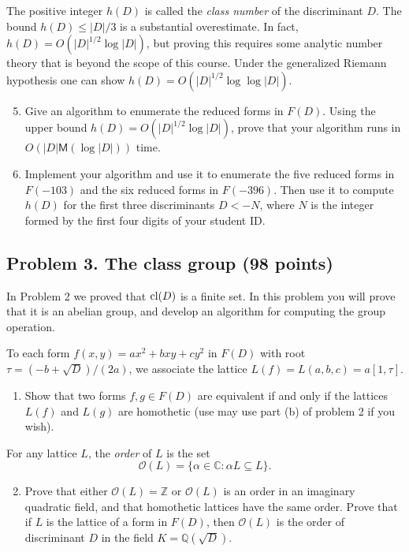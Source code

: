 \documentclass[11pt]{article}
\newcommand{\Q}{\mathbb{Q}}
\newcommand{\C}{\mathbb{C}}
\newcommand{\Z}{\mathbb{Z}}
\newcommand{\M}{\textsf{M}}
\renewcommand{\O}{\mathcal{O}}
\newcommand{\cl}{{\rm cl}}
\theoremstyle{definition}
\begin{document}
The positive integer $h(D)$ is called the \emph{class number} of the discriminant $D$.
The bound $h(D)\le|D|/3$ is a substantial overestimate.
In fact, $h(D)=O(|D|^{1/2}\log|D|)$, but proving this requires some analytic number theory that is beyond the scope of this course.
Under the generalized Riemann hypothesis one can show $h(D)=O(|D|^{1/2}\log\log|D|)$.

\begin{enumerate}[{\bf(a)}]
\setcounter{enumi}{4}
\item
Give an algorithm to enumerate the reduced forms in $F(D)$.
Using the upper bound $h(D)=O(|D|^{1/2}\log|D|)$, prove that your algorithm runs in $O(|D|\M(\log|D|))$ time.
\item
Implement your algorithm and use it to enumerate the five reduced forms in $F(-103)$ and the six reduced forms in $F(-396)$.
Then use it to compute $h(D)$ for the first three discriminants $D<-N$, where $N$ is the integer formed by the first four digits of your student ID.
\end{enumerate}

\subsection*{Problem 3. The class group (98 points)}
In Problem 2 we proved that $\cl(D)$ is a finite set.
In this problem you will prove that it is an abelian group, and develop an algorithm for computing the group operation.

To each form $f(x,y)=ax^2+bxy+cy^2$ in $F(D)$ with root $\tau=(-b+\sqrt{D})/(2a)$, we associate the lattice $L(f)=L(a,b,c)=a[1,\tau]$.
\begin{enumerate}[{\bf(a)}]
\item Show that two forms $f,g\in F(D)$ are equivalent if and only if the lattices $L(f)$ and $L(g)$ are homothetic (use may use part (b) of problem 2 if you wish).
\end{enumerate}

For any lattice $L$, the \emph{order} of $L$ is the set
\[
\O(L)=\{\alpha\in\C:\alpha L\subseteq L\}.
\]
\begin{enumerate}[{\bf(a)}]
\setcounter{enumi}{1}
\item Prove that either $\O(L)=\Z$ or $\O(L)$ is an order in an imaginary quadratic field, and that homothetic lattices have the same order.
Prove that if $L$ is the lattice of a form in $F(D)$, then $\O(L)$ is the order of discriminant $D$ in the field $K=\Q(\sqrt{D})$.
\end{enumerate}
\end{document}
